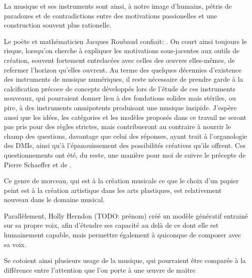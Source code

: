 La musique et ses instruments sont ainsi, à notre image d'humains, pétris de paradoxes et de contradictions entre des motivations passionelles et une construction souvent plus rationelle.


\noindent Le poète et mathématicien Jacques Roubaud confiait: . On court ainsi toujours le risque, lorsqu'on cherche à expliquer les motivations sous-jacentes aux outils de création, souvent fortement entrelacées avec celles des œuvres elles-mêmes, de refermer l'horizon qu'elles ouvrent. 
Au terme des quelques décennies d'existence des instruments de musique numériques, il reste nécessaire de prendre garde à la calcification précoce de concepts développés lors de l'étude de ces instruments nouveaux, qui pourraient donner lieu à des fondations solides mais stériles, ou pire, à des instruments omnipotents produisant une musique insipide.
J'espère aussi que les idées, les catégories et les modèles proposés dans ce travail ne seront pas pris pour des règles strictes, mais contribueront au contraire à nourrir le champ des questions, davantage que celui des réponses, ayant trait à l'organologie des \glspl{DMI}, ainsi qu'à l'épanouissement des possibilités créatives qu'ils offrent. Ces questionnements ont été, du reste, une manière pour moi de suivre le précepte de Pierre Schaeffer et de .








Ce genre de morceau, qui est à la création musicale ce que le choix d'un papier peint est à la création artistique dans les arts plastiques, est relativement nouveau dans le domaine musical. 

Parallèlement, Holly Herndon (TODO: prénom) créé un modèle génératif entrainé sur sa propre voix, afin d'étendre ses capacité au delà de ce dont elle est humainement capable, mais permettre également à quiconque de composer avec sa voix.

Se cotoient ainsi plusieurs usage de la musique, qui pourraient être comparée à la différence entre l'attention que l'on porte à une œuvre de maitre 


